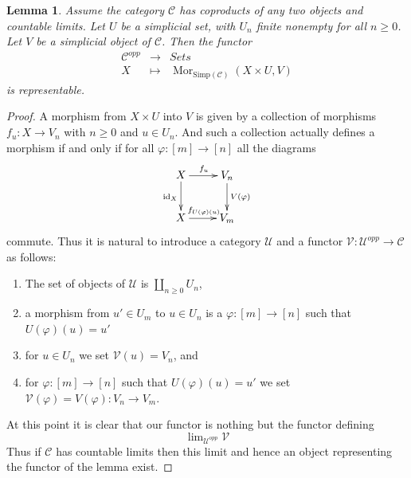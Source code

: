 \documentclass{stacks-project}
\theoremstyle{plain}
\newtheorem{lemma}[subsection]{Lemma}
\theoremstyle{definition}
\theoremstyle{remark}
\numberwithin{equation}{subsection}
\def\lim{\mathop{\mathrm{lim}}\nolimits}
\def\Mor{\mathop{\mathrm{Mor}}\nolimits}
\begin{document}
\begin{lemma}
\label{lemma-exists-hom-0-from-simplicial-set}
Assume the category $\mathcal{C}$
has coproducts of any two objects and countable
limits. Let $U$ be a simplicial set, with $U_n$ finite nonempty
for all $n \geq 0$.
Let $V$ be a simplicial object of $\mathcal{C}$.
Then the functor
\begin{eqnarray*}
\mathcal{C}^{opp} & \longrightarrow & \textit{Sets} \\
X
& \longmapsto &
\Mor_{\text{Simp}(\mathcal{C})}(X \times U, V)
\end{eqnarray*}
is representable.
\end{lemma}

\begin{proof}
A morphism from $X \times U$ into $V$ is given by a collection
of morphisms $f_u : X \to V_n$ with $n \geq 0$ and $u \in U_n$.
And such a collection actually defines a morphism if and only
if for all $\varphi : [m] \to [n]$ all the diagrams
$$
\xymatrix{
X \ar[r]^{f_u} \ar[d]_{\text{id}_X} & V_n \ar[d]^{V(\varphi)} \\
X \ar[r]^{f_{U(\varphi)(u)}} & V_m
}
$$
commute. Thus it is natural to introduce a category
$\mathcal{U}$ and a functor
$\mathcal{V} : \mathcal{U}^{opp} \to \mathcal{C}$
as follows:
\begin{enumerate}
\item The set of objects of $\mathcal{U}$ is
$\coprod_{n \geq 0} U_n$,
\item a morphism from $u' \in U_m$ to $u \in U_n$
is a $\varphi : [m] \to [n]$ such that $U(\varphi)(u) = u'$
\item for $u \in U_n$ we set $\mathcal{V}(u) = V_n$, and
\item for $\varphi : [m] \to [n]$ such that $U(\varphi)(u) = u'$
we set $\mathcal{V}(\varphi) = V(\varphi) : V_n \to V_m$.
\end{enumerate}
At this point it is clear that our functor is nothing but the
functor defining
$$
\lim_{\mathcal{U}^{opp}} \mathcal{V}
$$
Thus if $\mathcal{C}$ has countable limits then this limit
and hence an object representing the functor of the lemma
exist.
\end{proof}
\end{document}

